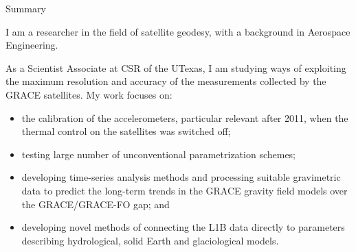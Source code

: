 
\begin{cvtext}{Summary}






I am a researcher in the field of satellite geodesy, with a background in Aerospace Engineering.

As a Scientist Associate at \ac{CSR} of the \ac{UTexas}, I am studying ways of exploiting the maximum resolution and accuracy of the measurements collected by the \ac{GRACE} satellites.
My work focuses on:
\begin{itemize}[topsep=0pt,itemsep=1pt,parsep=0pt,partopsep=0pt]
\item the calibration of the accelerometers, particular relevant after 2011, when the thermal control on the satellites was switched off;
\item testing large number of unconventional parametrization schemes;
\item developing time-series analysis methods and processing suitable gravimetric data to predict the long-term trends in the \ac{GRACE} gravity field models over the \ac{GRACE}\slash\ac{GRACE-FO} gap; and
\item developing novel methods of connecting the L1B data directly to parameters describing hydrological, solid Earth and glaciological models.
\end{itemize}


\end{cvtext}
